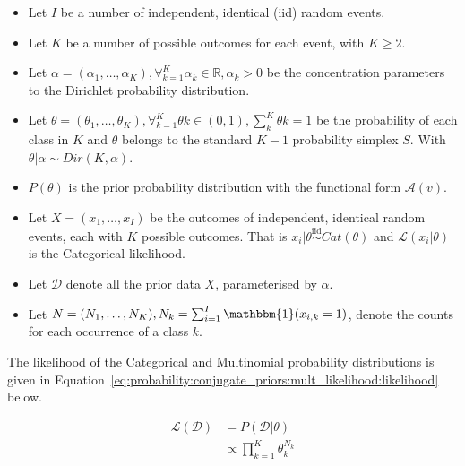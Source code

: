 \begin{itemize}
      \item Let $I$ be a number of independent, identical (iid) random events.

      \item Let $K$ be a number of possible outcomes for each event, with $K \geq 2$.

      \item Let $\alpha = (\alpha_{1}, \dots, \alpha_{K}), \forall_{k=1}^{K} \alpha_{k} \in \mathbb{R}, \alpha_{k} > 0$ be the concentration parameters to the Dirichlet probability distribution.

      \item Let $\theta = (\theta_{1}, \dots, \theta_{K}), \forall_{k=1}^{K} \theta{k} \in (0,1), \sum_{k}^{K} \theta{k} = 1$ be the probability of each class in $K$ and $\theta$ belongs to the standard $K-1$ probability simplex $S$. With $\theta | \alpha \sim Dir(K, \alpha)$.

      \item $P(\theta)$ is the prior probability distribution with the functional form $\mathcal{A}(v)$.

      \item Let $X = (x_{1}, \dots, x_{I})$ be the outcomes of independent, identical random events, each with $K$ possible outcomes. That is $x_{i} | \theta \overset{\text{iid}}{\sim} Cat(\theta)$ and $\mathcal{L}(x_{i} \vert \theta)$ is the Categorical likelihood.

      \item Let $\mathcal{D}$ denote all the prior data $X$, parameterised by $\alpha$.

      \item Let $N = (N_{1}, \dots, N_{K}), N_{k} = \sum_{i=1}^{I} \mathbbm{1}(x_{i,k} = 1)$, denote the counts for each occurrence of a class $k$.
\end{itemize}

\noindent
The likelihood of the Categorical and Multinomial probability distributions is given in Equation~\eqref{eq:probability:conjugate_priors:mult_likelihood:likelihood} below.

\begin{equation}
      \label{eq:probability:conjugate_priors:mult_likelihood:likelihood}
      \begin{split}
            \mathcal{L}(\mathcal{D}) &=  P(\mathcal{D} | \theta) \\
            &\propto \prod_{k=1}^{K} \theta_{k}^{N_{k}}
      \end{split}
\end{equation}


